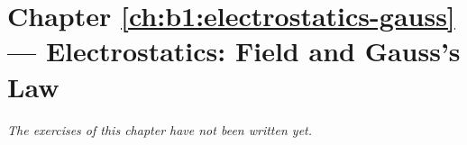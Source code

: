 \section*{Chapter \ref{ch:b1:electrostatics-gauss} --- Electrostatics: Field and Gauss's Law}


\emph{The exercises of this chapter have not been written yet.}
